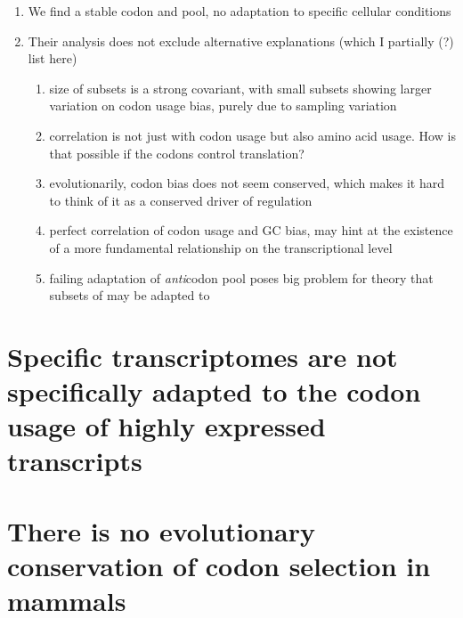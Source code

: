 \begin{enumerate}
    \item We find a stable codon and \trna pool, no adaptation to specific cellular
conditions

    \item Their analysis does not exclude alternative explanations (which I partially
(?) list here)

        \begin{enumerate}
            \item size of \mrna subsets is a strong covariant, with small subsets
                showing larger variation on codon usage bias, purely due to
                sampling variation
            \item correlation is not just with codon usage but also amino acid
                usage. How is that possible if the codons control translation?
            \item evolutionarily, codon bias does not seem conserved, which
                makes it hard to think of it as a conserved driver of regulation
            \item perfect correlation of codon usage and GC bias, may hint at
                the existence of a more fundamental relationship on the
                transcriptional level
            \item failing adaptation of \emph{anti}codon pool poses big problem
                for theory that subsets of \mrna may be adapted to
        \end{enumerate}
\end{enumerate}

\section{Specific  transcriptomes are not specifically adapted to the
codon usage of highly expressed  transcripts}

\section{There is no evolutionary conservation of codon selection in mammals}
